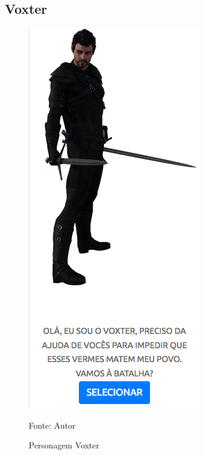 \subsection{Voxter}
\begin{figure}[h]
	\centering
	\includegraphics[keepaspectratio=true,scale=0.5]{figuras/voxter.png}
	\caption{Personagem Voxter}
	Fonte: Autor
	\label{voxter}
\end{figure}

\clearpage


